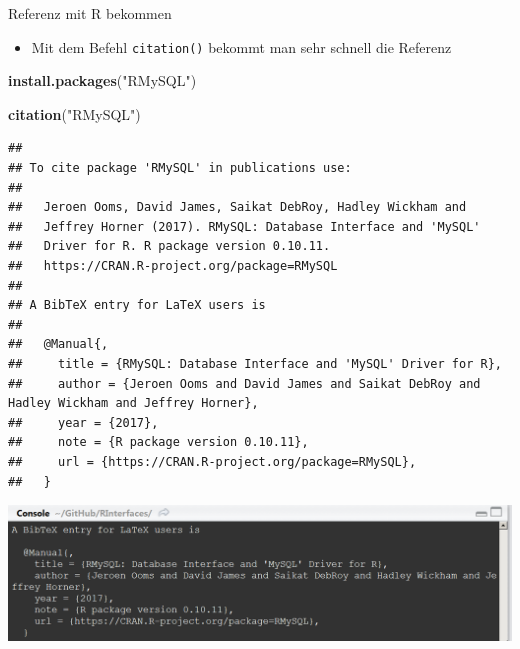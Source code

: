\documentclass[ignorenonframetext,]{beamer}
\newenvironment{Shaded}{}{}
\newcommand{\KeywordTok}[1]{\textcolor[rgb]{0.00,0.44,0.13}{\textbf{{#1}}}}
\newcommand{\StringTok}[1]{\textcolor[rgb]{0.25,0.44,0.63}{{#1}}}
\newcommand{\NormalTok}[1]{{#1}}
\providecommand{\tightlist}{%
\setlength{\itemsep}{0pt}\setlength{\parskip}{0pt}}
\begin{document}
\begin{frame}[fragile]{Referenz mit R bekommen}

\begin{itemize}
\tightlist
\item
  Mit dem Befehl \texttt{citation()} bekommt man sehr schnell die
  Referenz
\end{itemize}

\begin{Shaded}
\begin{Highlighting}[]
\KeywordTok{install.packages}\NormalTok{(}\StringTok{"RMySQL"}\NormalTok{)}
\end{Highlighting}
\end{Shaded}

\begin{Shaded}
\begin{Highlighting}[]
\KeywordTok{citation}\NormalTok{(}\StringTok{"RMySQL"}\NormalTok{)}
\end{Highlighting}
\end{Shaded}

\begin{verbatim}
## 
## To cite package 'RMySQL' in publications use:
## 
##   Jeroen Ooms, David James, Saikat DebRoy, Hadley Wickham and
##   Jeffrey Horner (2017). RMySQL: Database Interface and 'MySQL'
##   Driver for R. R package version 0.10.11.
##   https://CRAN.R-project.org/package=RMySQL
## 
## A BibTeX entry for LaTeX users is
## 
##   @Manual{,
##     title = {RMySQL: Database Interface and 'MySQL' Driver for R},
##     author = {Jeroen Ooms and David James and Saikat DebRoy and Hadley Wickham and Jeffrey Horner},
##     year = {2017},
##     note = {R package version 0.10.11},
##     url = {https://CRAN.R-project.org/package=RMySQL},
##   }
\end{verbatim}

\includegraphics{./tex2pdf.956/a3e1b0c65e3f5ed3460c3943bc46cd1a70379380.png}

\end{frame}
\end{document}
